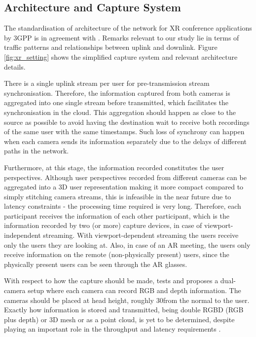 \subsection*{Architecture and Capture System}

The standardisation of architecture of the network for XR conference applications by 3GPP \cite{3GPP_xr} is in agreement with \cite{multi_sensor_tno}. Remarks relevant to our study lie in terms of traffic patterns and relationships between uplink and downlink. Figure \ref{fig:xr_setting} shows the simplified capture system and relevant architecture details. 


There is a single uplink stream per user for pre-transmission stream synchronisation. Therefore, the information captured from both cameras is aggregated into one single stream before transmitted, which facilitates the synchronisation in the cloud. This aggregation should happen as close to the source as possible to avoid having the destination wait to receive both recordings of the same user with the same timestamps. Such loss of synchrony can happen when each camera sends its information separately due to the delays of different paths in the network.

Furthermore, at this stage, the information recorded constitutes the user perspectives. Although user perspectives recorded from different cameras can be aggregated into a 3D user representation making it more compact compared to simply stitching camera streams, this is infeasible in the near future due to latency constraints - the processing time required is very long. Therefore, each participant receives the information of each other participant, which is the information recorded by two (or more) capture devices, in case of viewport-independent streaming. With viewport-dependent streaming the users receive only the users they are looking at. Also, in case of an \ac{AR} meeting, the users only receive information on the remote (non-physically present) users, since the physically present users can be seen through the AR glasses. 

With respect to how the capture should be made, \cite{double_rgb_tno} tests and proposes a dual-camera setup where each camera can record \ac{RGB} and depth information. The cameras should be placed at head height, roughly 30\tdeg from the normal to the user. Exactly how information is stored and transmitted, being double RGBD (RGB plus depth) or 3D mesh or as a point cloud, is yet to be determined, despite playing an important role in the throughput and latency requirements \cite{3GPP_xr}.


